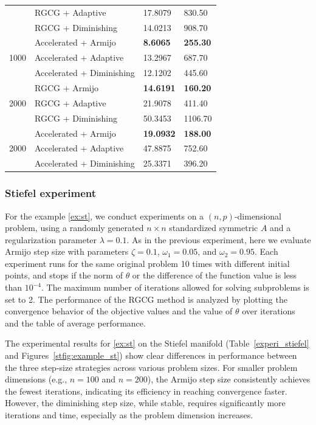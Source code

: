 \documentclass[pdflatex,sn-mathphys-num]{sn-jnl}%
\theoremstyle{definition} %
\theoremstyle{remark} %
\begin{document}
\begin{table}[htbp]
\begin{tabular}{l p{4.5cm} p{2.5cm} p{2.5cm}}
          & RGCG + Adaptive & 17.8079 & 830.50 \\
          & RGCG + Diminishing & 14.0213 & 908.70 \\
        \midrule
        \multirow{3}{*}{1000} 
          & Accelerated + Armijo & \textbf{8.6065} & \textbf{255.30} \\
          & Accelerated + Adaptive & 13.2967 & 687.70 \\
          & Accelerated + Diminishing & 12.1202 & 445.60 \\
        \midrule
        \multirow{3}{*}{2000} 
          & RGCG + Armijo & \textbf{14.6191} & \textbf{160.20} \\
          & RGCG + Adaptive & 21.9078 & 411.40 \\
          & RGCG + Diminishing & 50.3453 & 1106.70 \\
        \midrule
        \multirow{3}{*}{2000} 
          & Accelerated + Armijo & \textbf{19.0932} & \textbf{188.00} \\
          & Accelerated + Adaptive & 47.8875 & 752.60 \\
          & Accelerated + Diminishing & 25.3371 & 396.20 \\
        \midrule
    \end{tabular}
    \label{table:sphere_compare}
\end{table}

\subsubsection{Stiefel experiment}
 For the example \eqref{ex:st}, we conduct experiments on a $(n,p)$-dimensional problem, using a randomly generated \( n \times n \) standardized symmetric \( A \) and a regularization parameter \( \lambda = 0.1 \). As in the previous experiment, here we evaluate Armijo step size with parameters \( \zeta = 0.1 \), \( \omega_1 = 0.05 \), and \( \omega_2 = 0.95 \). Each experiment runs for the same original problem 10 times with different initial points, and stops if the norm of \(\theta\) or the difference of the function value is less than \(10^{-4}\). The maximum number of iterations allowed for solving subproblems is set to 2.
 The performance of the RGCG method is analyzed by plotting the convergence behavior of the objective values and the value of \( \theta \) over iterations and the table of average performance.



The experimental results for \eqref{ex:st} on the Stiefel manifold (Table~\ref{experi_stiefel} and Figures~\ref{stfig:example_st}) show clear differences in performance between the three step-size strategies across various problem sizes. For smaller problem dimensions (e.g., \( n = 100 \) and \( n = 200 \)), the Armijo step size consistently achieves the fewest iterations, indicating its efficiency in reaching convergence faster. However, the diminishing step size, while stable, requires significantly more iterations and time, especially as the problem dimension increases.
\end{document}
